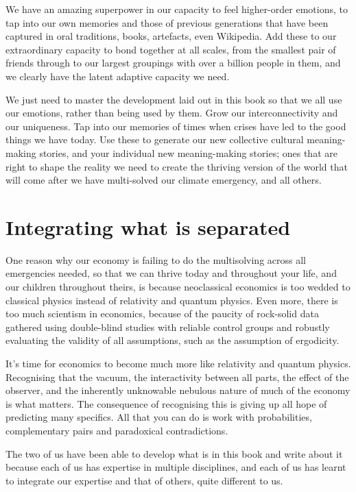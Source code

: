 We have an amazing superpower in our capacity to feel higher-order emotions, to tap into our own memories and those of previous generations that have been captured in oral traditions, books, artefacts, even Wikipedia. Add these to our extraordinary capacity to bond together at all scales, from the smallest pair of friends through to our largest groupings with over a billion people in them, and we clearly have the latent adaptive capacity we need.


We just need to master the development laid out in this book so that we all use our emotions, rather than being used by them. Grow our interconnectivity and our uniqueness. Tap into our memories of times when crises have led to the good things we have today. Use these to generate our new collective cultural meaning-making stories, and your individual new meaning-making stories; ones that are right to shape the reality we need to create the thriving version of the world that will come after we have multi-solved our climate emergency, and all others.
\section{Integrating what is separated}
One reason why our economy is failing to do the multisolving across all emergencies needed, so that we can thrive today and throughout your life, and our children throughout theirs, is because neoclassical economics is too wedded to classical physics instead of relativity and quantum physics. Even more, there is too much scientism in economics, because of the paucity of rock-solid data gathered using double-blind studies with reliable control groups and robustly evaluating the validity of all assumptions, such as the assumption of ergodicity\cite{buchanan-ergodicity, peters-ergodicity-economics}.


It's time for economics  to become much more like relativity and quantum physics. Recognising that the vacuum, the interactivity between all parts, the effect of the observer, and the inherently unknowable nebulous nature of much of the economy is what matters. The consequence of recognising this is giving up all hope of predicting many specifics. All that you can do is work with probabilities, complementary pairs and paradoxical contradictions.


The two of us have been able to develop what is in this book and write about it because each of us has expertise in multiple disciplines, and each of us has learnt to integrate our expertise and that of others, quite different to us. 


